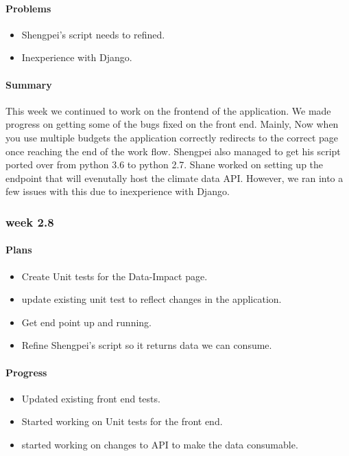 \documentclass[onecolumn, draftclsnofoot,10pt, compsoc]{article}
\begin{document}
				\paragraph{Problems} \hfill \break
				\begin{itemize}
					\item Shengpei's script needs to refined.
					\item Inexperience with Django.
				\end{itemize}
			\paragraph{Summary} \hfill \break
			This week we continued to work on the frontend of the application. We made progress on getting some of the bugs fixed on the front end. Mainly, Now when you use multiple budgets the application correctly redirects to the correct page once reaching the end of the work flow. Shengpei also managed to get his script ported over from python 3.6 to python 2.7. Shane worked on setting up the endpoint that will evenutally host the climate data API. However, we ran into a few issues with this due to inexperience with Django.\\
			
		\subsubsection{week 2.8}
			\paragraph{Plans} \hfill \break
				\begin{itemize}
					\item Create Unit tests for the Data-Impact page.
					\item update existing unit test to reflect changes in the application.
					\item Get end point up and running.
					\item Refine Shengpei's script so it returns data we can consume.
				\end{itemize}
			\paragraph{Progress} \hfill \break
				\begin{itemize}
					\item Updated existing front end tests.
					\item Started working on Unit tests for the front end.
					\item started working on changes to API to make the data consumable.
				\end{itemize}
\end{document}
